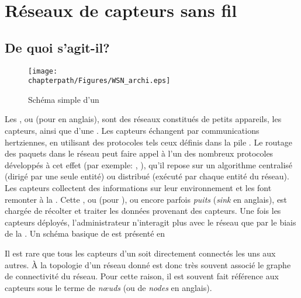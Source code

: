 \section{Réseaux de capteurs sans fil}
\label{st:sec:contexte}

    \subsection{De quoi s'agit-il?}
\begin{figure}[!b]
    \centering
    \texttt{[image: \\chapterpath/Figures/WSN\_archi.eps]}
    \caption{Schéma simple d'un \rcsf}\label{st:fig:wsnintro}
\end{figure}
Les \rcsfs, ou \textit{\WSN} (pour \wsns en anglais), sont des réseaux constitués de petits appareils, les capteurs, ainsi que d'une \sdb.
Les capteurs échangent par communications hertziennes, en utilisant des protocoles tels ceux définis dans la pile \ieeee.
Le routage des paquets dans le réseau peut faire appel à l'un des nombreux protocoles développés à cet effet (par exemple: \aodv, \olsr), qu'il repose sur un algorithme centralisé (dirigé par une seule entité) ou distribué (exécuté par chaque entité du réseau).
Les capteurs collectent des informations sur leur environnement et les font remonter à la \sdb.
Cette \sdb, ou \BS (pour \bs), ou encore parfois \textit{puits} (\textit{sink} en anglais), est chargée de récolter et traiter les données provenant des capteurs.
Une fois les capteurs déployés, l'administrateur n'interagit plus avec le réseau que par le biais de la \sdb.
Un schéma basique de \rcsf est présenté en 

Il est rare que tous les capteurs d'un \WSN soit directement connectés les uns aux autres.
À la topologie d'un réseau donné est donc très souvent associé le graphe de connectivité du réseau.
Pour cette raison, il est souvent fait référence aux capteurs sous le terme de \textit{nœuds} (ou de \textit{nodes} en anglais).

